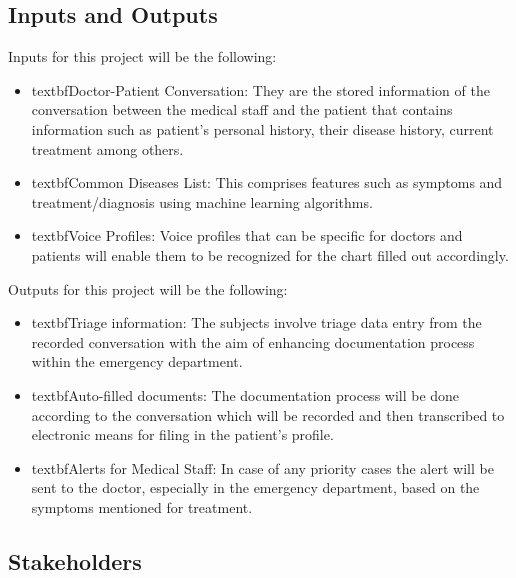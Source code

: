 \documentclass{article}
\begin{document}
\subsection{Inputs and Outputs}


Inputs for this project will be the following:

\begin{itemize}
    \item textbf{Doctor-Patient Conversation}: They are the stored information of the conversation between the medical staff and the patient that contains information such as patient’s personal history, their disease history, current treatment among others.
    \item textbf{Common Diseases List}: This comprises features such as symptoms and treatment/diagnosis using machine learning algorithms.
    \item textbf{Voice Profiles}: Voice profiles that can be specific for doctors and patients will enable them to be recognized for the chart filled out accordingly. 
\end {itemize}

Outputs for this project will be the following: 

\begin{itemize} 
    \item textbf{Triage information}: The subjects involve triage data entry from the recorded conversation with the aim of enhancing documentation process within the emergency department.
    \item textbf{Auto-filled documents}: The documentation process will be done according to the conversation which will be recorded and then transcribed to electronic means for filing in the patient’s profile.
    \item textbf{Alerts for Medical Staff}: In case of any priority cases the alert will be sent to the doctor, especially in the emergency department, based on the symptoms mentioned for treatment.
\end{itemize}  

\subsection{Stakeholders}
\end{document}
